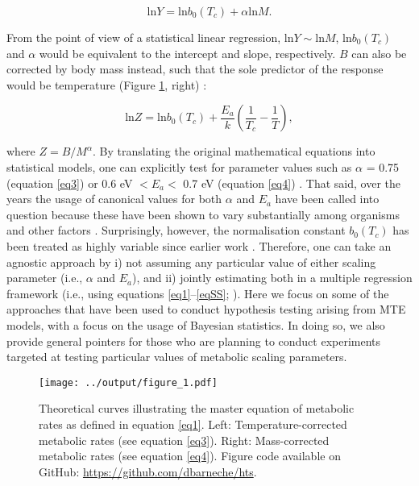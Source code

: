 \documentclass[a4paper,12pt]{article}
\begin{document}
\begin{equation}
  \textrm{ln}Y = \textrm{ln}b_0(T_c) + \alpha \textrm{ln}M.
  \label{eq3}
\end{equation}

From the point of view of a statistical linear regression, $\textrm{ln}Y \sim \textrm{ln}M$, $\textrm{ln}b_0(T_c)$ and $\alpha$ would be equivalent to the intercept and slope, respectively. $B$ can also be corrected by body mass instead, such that the sole predictor of the response would be temperature (Figure \ref{fig1}, right) \cite{brown2004ecology, savage2004amnat}:

\begin{equation}
  \textrm{ln}Z = \textrm{ln}b_0(T_c) + \frac{E_a}{k}\left(\frac{1}{T_c} - \frac{1}{T}\right),
  \label{eq4}
\end{equation}

where $Z = B / M^\alpha$. By translating the original mathematical equations into statistical models, one can explicitly test for parameter values such as $\alpha$ = 0.75 (equation \ref{eq3}) or 0.6 eV $< E_a <$ 0.7 eV (equation \ref{eq4}) \cite{west1997science, gillooly2001science, brown2004ecology}. That said, over the years the usage of canonical values for both $\alpha$ and $E_a$ have been called into question because these have been shown to vary substantially among organisms and other factors \cite{makarieva2005functecol, glazier2005biolrev, moses2008amnat, glazier2010biolrev, pawar2015amnat, barton2019limn, white2003pnas, white2005jeb, delong2010pnas}. Surprisingly, however, the normalisation constant $b_0(T_c)$ has been treated as highly variable since earlier work \cite{brown2004ecology}. Therefore, one can take an agnostic approach by i) not assuming any particular value of either scaling parameter (i.e., $\alpha$ and $E_a$), and ii) jointly estimating both in a multiple regression framework (i.e., using equations \ref{eq1}--\ref{eqSS}; \cite{barneche2014ele}). Here we focus on some of the approaches that have been used to conduct hypothesis testing arising from MTE models, with a focus on the usage of Bayesian statistics. In doing so, we also provide general pointers for those who are planning to conduct experiments targeted at testing particular values of metabolic scaling parameters.

\bigskip
\bigskip

\begin{figure}[h!]
  \begin{center}
    \texttt{[image: ../output/figure\_1.pdf]}
  \end{center}
  \caption{Theoretical curves illustrating the master equation of metabolic rates as defined in equation \ref{eq1}. Left: Temperature-corrected metabolic rates (see equation \ref{eq3}). Right: Mass-corrected metabolic rates (see equation \ref{eq4}). Figure code available on GitHub: \url{https://github.com/dbarneche/hts}.}
  \label{fig1}
\end{figure}
\end{document}
